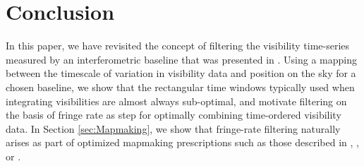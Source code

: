 \documentclass[twocolumn,apj,numberedappendix]{emulateapj}
\newcommand{\vis}{\mathbf{v}}
\newcommand{\A}{\mathbf{A}}
\newcommand{\N}{\mathbf{N}}
\begin{document}
%

\section{Conclusion}
\label{sec:conclusion}

In this paper, we have revisited the concept of filtering the visibility time-series
measured by an interferometric baseline that was presented in \citet{parsons_backer2009}.
Using a mapping between the timescale of variation in visibility data and position
on the sky for a chosen baseline, we show that the rectangular time windows typically
used when integrating visibilities are almost always sub-optimal, and motivate 
filtering on the basis of fringe rate
as step for optimally combining time-ordered visibility data.  In Section \ref{sec:Mapmaking}, we show 
that fringe-rate filtering naturally arises as part of optimized mapmaking prescriptions such as those
described in \citet{T97mapmaking}, \citet{morales_matejek2009}, or \citet{dillon_et_al2015}.
\end{document}
